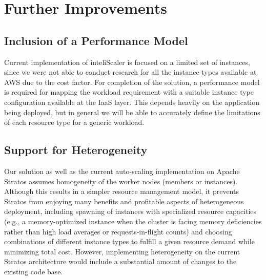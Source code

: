 \section{Further Improvements}
\subsection{Inclusion of a Performance Model}
Current implementation of inteliScaler is focused on a limited set of instances, since we were not able to conduct research for all the instance types available at AWS due to the cost factor. For completion of the solution, a performance model is required for mapping the workload requirement with a suitable instance type configuration available at the IaaS layer. This depends heavily on the application being deployed, but in general we will be able to accurately define the limitations of each resource type for a generic workload.

\subsection{Support for Heterogeneity}
Our solution as well as the current auto-scaling implementation on Apache Stratos assumes homogeneity of the worker nodes (members or instances). Although this results in a simpler resource management model, it prevents Stratos from enjoying many benefits and profitable aspects of heterogeneous deployment, including spawning of instances with specialized resource capacities (e.g., a memory-optimized instance when the cluster is facing memory deficiencies rather than high load averages or requests-in-flight counts) and choosing combinations of different instance types to fulfill a given resource demand while minimizing total cost. However, implementing heterogeneity on the current Stratos architecture would include a substantial amount of changes to the existing code base.